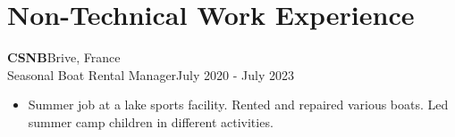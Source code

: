 \documentclass[a4paper, 10pt]{article}
\newenvironment{highlights}{
    \begin{itemize}[
        topsep=0.10 cm,
        parsep=0.10 cm,
        partopsep=0pt,
        itemsep=0pt,
        leftmargin=0.4 cm + 10pt
    ]
}{
    \end{itemize}
} %
\begin{document}
    
    
    \section{Non-Technical Work Experience}
    
    \textbf{CSNB}\hfill Brive, France\\
    Seasonal Boat Rental Manager\hfill July 2020 - July 2023
    \begin{highlights}
        \item Summer job at a lake sports facility. Rented and repaired various boats. Led summer
        camp children in different activities.
    \end{highlights}
    
    
\end{document}

